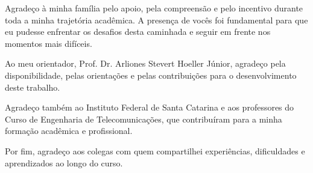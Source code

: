 \begin{agradecimentos}
    
    Agradeço à minha família pelo apoio, pela compreensão e pelo incentivo durante toda a minha trajetória acadêmica. A presença de vocês foi fundamental para que eu pudesse enfrentar os desafios desta caminhada e seguir em frente nos momentos mais difíceis.

    Ao meu orientador, Prof. Dr. Arliones Stevert Hoeller Júnior, agradeço pela disponibilidade, pelas orientações e pelas contribuições para o desenvolvimento deste trabalho.

    Agradeço também ao Instituto Federal de Santa Catarina e aos professores do Curso de Engenharia de Telecomunicações, que contribuíram para a minha formação acadêmica e profissional.

    Por fim, agradeço aos colegas com quem compartilhei experiências, dificuldades e aprendizados ao longo do curso.
    
\end{agradecimentos}